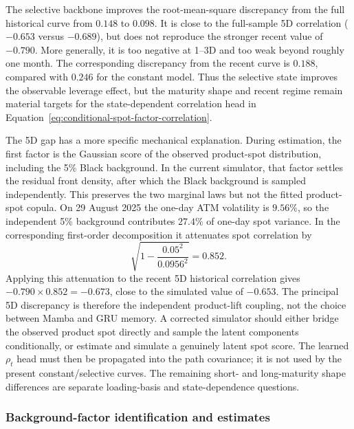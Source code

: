 \documentclass[11pt]{article}
\theoremstyle{plain}
\theoremstyle{definition}
\theoremstyle{remark}
\begin{document}
The selective backbone improves the root-mean-square discrepancy from the
full historical curve from $0.148$ to $0.098$.  It is close to the
full-sample 5D correlation ($-0.653$ versus $-0.689$), but does not reproduce
the stronger recent value of $-0.790$.  More generally, it is too negative
at 1--3D and too weak beyond roughly one month.  The corresponding discrepancy
from the recent curve is $0.188$, compared with $0.246$ for the constant
model.  Thus the selective state improves the observable leverage effect,
but the maturity shape and recent regime remain material targets for the
state-dependent correlation head in
Equation~\eqref{eq:conditional-spot-factor-correlation}.

The 5D gap has a more specific mechanical explanation.  During estimation,
the first factor is the Gaussian score of the observed product-spot
distribution, including the 5\% Black background.  In the current simulator,
that factor settles the residual front density, after which the Black
background is sampled independently.  This preserves the two marginal laws
but not the fitted product-spot copula.  On 29 August 2025 the one-day ATM
volatility is $9.56\%$, so the independent 5\% background contributes $27.4\%$
of one-day spot variance.  In the corresponding first-order decomposition it
attenuates spot correlation by
\begin{equation}
  \sqrt{1-\frac{0.05^2}{0.0956^2}}=0.852.
  \label{eq:background-correlation-attenuation}
\end{equation}
Applying this attenuation to the recent 5D historical correlation gives
$-0.790\times0.852=-0.673$, close to the simulated value of $-0.653$.
The principal 5D discrepancy is therefore the independent product-lift
coupling, not the choice between Mamba and GRU memory.  A corrected simulator
should either bridge the observed product spot directly and sample the latent
components conditionally, or estimate and simulate a genuinely latent spot
score.  The learned $\rho_t$ head must then be propagated into the path
covariance; it is not used by the present constant/selective curves.  The
remaining short- and long-maturity shape differences are separate loading-basis
and state-dependence questions.

\subsubsection{Background-factor identification and estimates}
\label{sec:background-factor-estimates}
\end{document}
